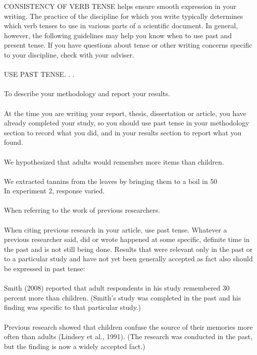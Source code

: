 CONSISTENCY OF VERB TENSE helps ensure smooth expression in your writing. The practice of the discipline for which you write typically determines which verb tenses to use in various parts of a scientific document. In general, however, the following guidelines may help you know when to use past and present tense. If you have questions about tense or other writing concerns specific to your discipline, check with your adviser.\\
\\
USE PAST TENSE. . .\\
\\
To describe your methodology and report your results.\\
\\
At the time you are writing your report, thesis, dissertation or article, you have already completed your study, so you should use past tense in your methodology section to record what you did, and in your results section to report what you found.\\
\\
       We hypothesized that adults would remember more items than children.\\
\\
       We extracted tannins from the leaves by bringing them to a boil in 50%
\\
       In experiment 2, response varied.\\
\\
When referring to the work of previous researchers.\\
\\
When citing previous research in your article, use past tense. Whatever a previous researcher said, did or wrote happened at some specific, definite time in the past and is not still being done. Results that were relevant only in the past or to a particular study and have not yet been generally accepted as fact also should be expressed in past tense:\\
\\
Smith (2008) reported that adult respondents in his study remembered 30 percent more than children. (Smith's study was completed in the past and his finding was specific to that particular study.)\\
\\
Previous research showed that children confuse the source of their memories more often than adults (Lindsey et al., 1991). (The research was conducted in the past, but the finding is now a widely accepted fact.)\\
